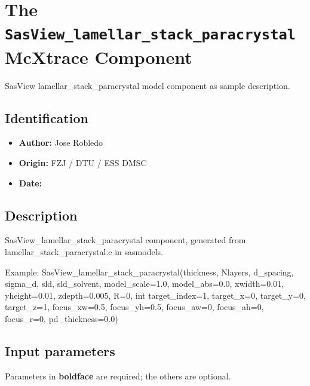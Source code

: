 \section{The \texttt{SasView\_lamellar\_stack\_paracrystal} McXtrace Component}
SasView lamellar\_stack\_paracrystal model component as sample description.

\subsection*{Identification}
\begin{itemize}
  \item \textbf{Author:} Jose Robledo
  \item \textbf{Origin:} FZJ / DTU / ESS DMSC
  \item \textbf{Date:} 
\end{itemize}

\subsection*{Description}
SasView\_lamellar\_stack\_paracrystal component, generated from lamellar\_stack\_paracrystal.c in sasmodels.

Example: SasView\_lamellar\_stack\_paracrystal(thickness, Nlayers, d\_spacing, sigma\_d, sld, sld\_solvent, model\_scale=1.0, model\_abs=0.0, xwidth=0.01, yheight=0.01, zdepth=0.005, R=0, int target\_index=1, target\_x=0, target\_y=0, target\_z=1, focus\_xw=0.5, focus\_yh=0.5, focus\_aw=0, focus\_ah=0, focus\_r=0, pd\_thickness=0.0)

\subsection*{Input parameters}
Parameters in \textbf{boldface} are required; the others are optional.

